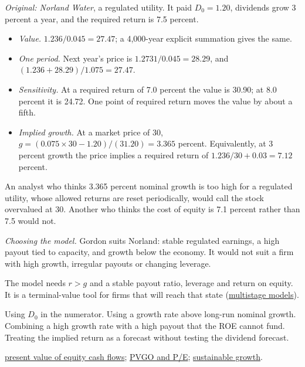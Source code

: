 \begin{qfmethod}
 \emph{Original: Norland Water}, a regulated utility. It paid $D_0=1.20$, dividends grow 3 percent a year, and the required return is 7.5 percent.
\begin{itemize}
\item \emph{Value.} $1.236/0.045=27.47$; a 4,000-year explicit summation gives the same.
\item \emph{One period.} Next year's price is $1.2731/0.045=28.29$, and $(1.236+28.29)/1.075=27.47$.
\item \emph{Sensitivity.} At a required return of 7.0 percent the value is 30.90; at 8.0 percent it is 24.72. One point of required return moves the value by about a fifth.
\item \emph{Implied growth.} At a market price of 30, $g=(0.075\times30-1.20)/(31.20)=3.365$ percent. Equivalently, at 3 percent growth the price implies a required return of $1.236/30+0.03=7.12$ percent.
\end{itemize}
An analyst who thinks 3.365 percent nominal growth is too high for a regulated utility, whose allowed returns are reset periodically, would call the stock overvalued at 30. Another who thinks the cost of equity is 7.1 percent rather than 7.5 would not.

\emph{Choosing the model.} Gordon suits Norland: stable regulated earnings, a high payout tied to capacity, and growth below the economy. It would not suit a firm with high growth, irregular payouts or changing leverage.

 The model needs $r>g$ and a stable payout ratio, leverage and return on equity. It is a terminal-value tool for firms that will reach that state (\hyperref[meth:multistage-ddm]{multistage models}).

 Using $D_0$ in the numerator. Using a growth rate above long-run nominal growth. Combining a high growth rate with a high payout that the ROE cannot fund. Treating the implied return as a forecast without testing the dividend forecast.

 \hyperref[meth:instrument-present-value]{present value of equity cash flows}; \hyperref[meth:pvgo-justified-pe]{PVGO and P/E}; \hyperref[meth:sustainable-growth]{sustainable growth}.

\end{qfmethod}

